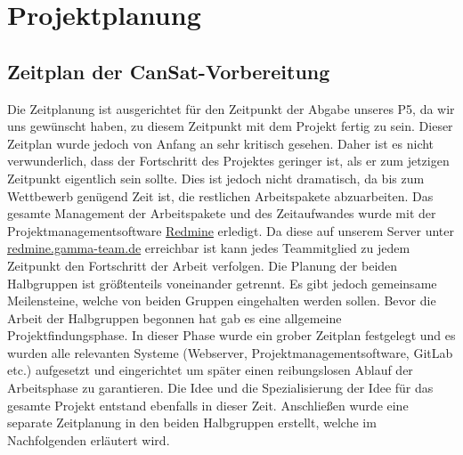 \section{Projektplanung}
\subsection{Zeitplan der CanSat-Vorbereitung}
Die Zeitplanung ist ausgerichtet für den Zeitpunkt der Abgabe unseres P5, da wir uns gewünscht haben, zu diesem Zeitpunkt mit dem Projekt fertig zu sein. Dieser Zeitplan wurde jedoch von Anfang an sehr kritisch gesehen. Daher ist es nicht verwunderlich, dass der Fortschritt des Projektes geringer ist, als er zum jetzigen Zeitpunkt eigentlich sein sollte. Dies ist jedoch nicht dramatisch, da bis zum Wettbewerb genügend Zeit ist, die restlichen Arbeitspakete abzuarbeiten. Das gesamte Management der Arbeitspakete und des Zeitaufwandes wurde mit der Projektmanagementsoftware \href {www.redmine.org} {Redmine} erledigt. Da diese auf unserem Server unter \href{http://redmine.gamma-team.de}{redmine.gamma-team.de} erreichbar ist kann jedes Teammitglied zu jedem Zeitpunkt den Fortschritt der Arbeit verfolgen. Die Planung der beiden Halbgruppen ist größtenteils voneinander getrennt. Es gibt jedoch gemeinsame Meilensteine, welche von beiden Gruppen eingehalten werden sollen. Bevor die Arbeit der Halbgruppen begonnen hat gab es eine allgemeine Projektfindungsphase. In dieser Phase wurde ein grober Zeitplan festgelegt und es wurden alle relevanten Systeme (Webserver, Projektmanagementsoftware, GitLab etc.) aufgesetzt und eingerichtet um später einen reibungslosen Ablauf der Arbeitsphase zu garantieren. Die Idee und die Spezialisierung der Idee für das gesamte Projekt entstand ebenfalls in dieser Zeit. Anschließen wurde eine separate Zeitplanung in den beiden Halbgruppen erstellt, welche im Nachfolgenden erläutert wird.
